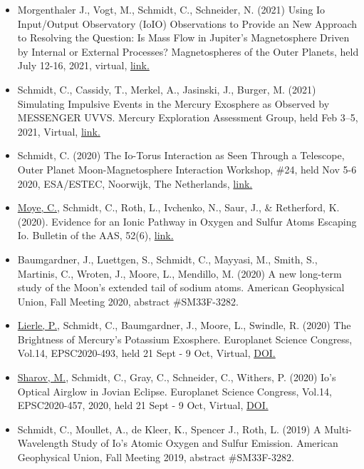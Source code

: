 \documentclass[12pt]{report}
\begin{document}
\begin{itemize}
   \item Morgenthaler J., Vogt, M., Schmidt, C., Schneider, N. (2021) Using Io Input/Output Observatory (IoIO) Observations to Provide an New Approach to Resolving the Question: Is Mass Flow in Jupiter's Magnetosphere Driven by Internal or External Processes? Magnetospheres of the Outer Planets, held July 12-16, 2021, virtual, \href{https://www.mop.uliege.be/upload/docs/application/pdf/2021-06/mop21_conference_booklet.pdf}{link.} 
   \item Schmidt, C., Cassidy, T., Merkel, A., Jasinski, J., Burger, M. (2021) Simulating Impulsive Events in the Mercury Exosphere as Observed by MESSENGER UVVS. Mercury Exploration Assessment Group, held Feb 3–5, 2021, Virtual, \href{https://www.hou.usra.edu/meetings/mexag2021/pdf/mexag2021_program.htm#sess201}{link.} 
   \item Schmidt, C. (2020) The Io-Torus Interaction as Seen Through a Telescope, Outer Planet Moon-Magnetosphere Interaction Workshop, \#24, held Nov 5-6 2020, ESA/ESTEC, Noorwijk, The Netherlands, \href{https://indico.esa.int/event/337/contributions/5611/contribution.pdf}{link.} 
   \item \underline{Moye, C.}, Schmidt, C., Roth, L., Ivchenko, N., Saur, J., \& Retherford, K. (2020). Evidence for an Ionic Pathway in Oxygen and Sulfur Atoms Escaping Io. Bulletin of the AAS, 52(6), \href{https://baas.aas.org/pub/2020n6i318p02}{link.}
   \item Baumgardner, J., Luettgen, S., Schmidt, C., Mayyasi, M., Smith, S., Martinis, C., Wroten, J., Moore, L., Mendillo, M. (2020) A new long-term study of the Moon’s extended tail of sodium atoms. American Geophysical Union, Fall Meeting 2020, abstract \#SM33F-3282.
   \item \underline{Lierle, P.}, Schmidt, C., Baumgardner, J., Moore, L., Swindle, R. (2020) The Brightness of Mercury's Potassium Exosphere. Europlanet Science Congress, Vol.14, EPSC2020-493, held 21 Sept - 9 Oct, Virtual, \href{https://doi.org/10.5194/epsc2020-493}{DOI.}
   \item \underline{Sharov, M.}, Schmidt, C., Gray, C., Schneider, C., Withers, P. (2020) Io's Optical Airglow in Jovian Eclipse. Europlanet Science Congress, Vol.14, EPSC2020-457, 2020, held 21 Sept - 9 Oct, Virtual, \href{https://doi.org/10.5194/epsc2020-457}{DOI.}
   \item Schmidt, C., Moullet, A., de Kleer, K., Spencer J., Roth, L. (2019) A Multi-Wavelength Study of Io's Atomic Oxygen and Sulfur Emission. American Geophysical Union, Fall Meeting 2019, abstract \#SM33F-3282.

\end{itemize}
\end{document}
